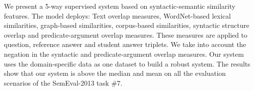We present a 5-way supervised system based on syntactic-semantic similarity features. The model deploys: Text overlap measures, WordNet-based lexical
 similarities, graph-based similarities, corpus-based similarities, syntactic
 structure overlap and predicate-argument overlap measures. These measures are
 applied to question, reference answer and student answer triplets. We take into
 account the negation in the syntactic and predicate-argument overlap measures.
 Our system uses the domain-specific data as one dataset to build a robust
 system. The results show that our system is above the median and mean on all
 the evaluation scenarios of the SemEval-2013 task \#7.

